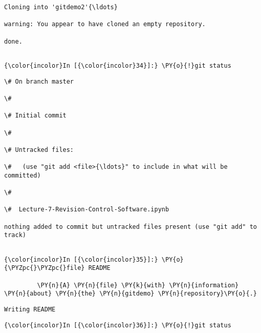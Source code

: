     \begin{Verbatim}[commandchars=\\\{\}]
Cloning into 'gitdemo2'{\ldots}

warning: You appear to have cloned an empty repository.

done.


    \end{Verbatim}







    \begin{Verbatim}[commandchars=\\\{\}]
{\color{incolor}In [{\color{incolor}34}]:} \PY{o}{!}git status
\end{Verbatim}

    \begin{Verbatim}[commandchars=\\\{\}]
\# On branch master

\#

\# Initial commit

\#

\# Untracked files:

\#   (use "git add <file>{\ldots}" to include in what will be committed)

\#

\#	Lecture-7-Revision-Control-Software.ipynb

nothing added to commit but untracked files present (use "git add" to track)


    \end{Verbatim}







    \begin{Verbatim}[commandchars=\\\{\}]
{\color{incolor}In [{\color{incolor}35}]:} \PY{o}{\PYZpc{}\PYZpc{}file} README
         
         \PY{n}{A} \PY{n}{file} \PY{k}{with} \PY{n}{information} \PY{n}{about} \PY{n}{the} \PY{n}{gitdemo} \PY{n}{repository}\PY{o}{.}
\end{Verbatim}

    \begin{Verbatim}[commandchars=\\\{\}]
Writing README

    \end{Verbatim}

    \begin{Verbatim}[commandchars=\\\{\}]
{\color{incolor}In [{\color{incolor}36}]:} \PY{o}{!}git status
\end{Verbatim}

